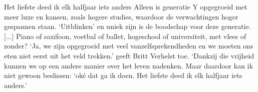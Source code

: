 \documentclass[main.tex]{subfiles}
\begin{document}
\begin{examenvraag}
\begin{antwoord}
        \begin{citaat}{Het liefste deed ik elk halfjaar iets anders}
            Alleen is generatie Y opgegroeid met meer luxe en kansen, zoals hogere studies, waardoor de verwachtingen hoger gespannen staan.
            `Uitblinken' en uniek zijn is de boodschap voor deze generatie.
            [...]
            Piano of saxifoon, voetbal of ballet, hogeschool of universiteit, met vlees of zonder? `Ja, we zijn opgegroeid met veel vanzelfsprekendheden en we moeten ons eten niet eerst uit het veld trekken.' geeft Britt Verhelst toe.
            `Dankzij die vrijheid kunnen we op een andere manier over het leven nadenken.
            Maar daardoor kan ik niet gewoon beslissen: `ok\'e dat ga ik doen. Het liefste deed ik elk halfjaar iets anders.'
        \end{citaat}
    \end{antwoord}
\end{examenvraag}
\end{document}
